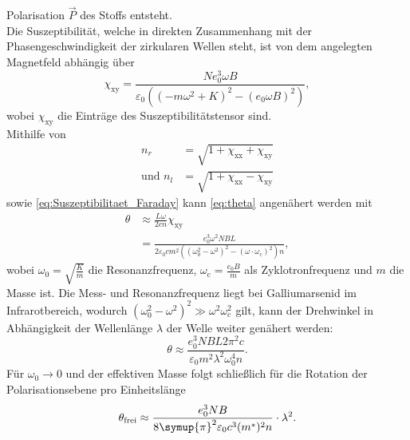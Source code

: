 Polarisation $\vec{P}$ des Stoffs entsteht.\\
Die Suszeptibilität, welche in direkten Zusammenhang mit der Phasengeschwindigkeit der zirkularen Wellen steht, ist von dem angelegten Magnetfeld abhängig über
\begin{equation}
    \chi_\text{xy} = \frac{Ne_0^3\omega B}{\varepsilon_0\left(\left(-m\omega^2+K\right)^2-\left(e_0\omega B\right)^2\right)},
    \label{eq:Suszeptibilitaet_Faraday}
\end{equation}
wobei $\chi_\text{xy}$ die Einträge des Suszeptibilitätstensor sind.\\
Mithilfe von 
\begin{align}
    n_r &= \sqrt{1+\chi_\text{xx}+\chi_\text{xy}} \\
     \text{und } n_l &= \sqrt{1+\chi_\text{xx}-\chi_\text{xy}}
\end{align}
sowie \autoref{eq:Suszeptibilitaet_Faraday} kann \autoref{eq:theta} angenähert werden mit 
\begin{align}
    \theta &\approx \frac{L\omega}{2cn}\chi_{\text{xy}} \label{eq:theta_rl_chi} \\
    &= \frac{e_0^3\omega^2 NBL} {2\varepsilon_0 cm^2\left(\left(\omega_0^2-\omega^2\right)^2-\left(\omega \cdot \omega_\text{c}\right)^2\right)n},
\end{align}
wobei $\omega_0 = \sqrt{\frac{K}{m}}$ die Resonanzfrequenz, $\omega_\text{c} = \frac{e_0B}{m}$ als Zyklotronfrequenz und $m$ die Masse ist. Die Mess- und Resonanzfrequenz
liegt bei Galliumarsenid im Infrarotbereich, wodurch $\left(\omega_0^2 - \omega^2\right)^2 \gg \omega^2\omega_c^2$ gilt, kann der Drehwinkel in Abhängigkeit der Wellenlänge
$\lambda$ der Welle weiter genähert werden:
\begin{equation}
    \theta \approx \frac{e_0^3 NBL 2 \pi^2 c}{\varepsilon_0 m^2 \lambda^2 \omega_0^4 n}.
\end{equation}
Für $\omega_0 \rightarrow 0$ und der effektiven Masse folgt schließlich für die Rotation der Polarisationsebene pro Einheitslänge
\begin{equation}
    \label{eqn:t_frei}
    \theta_\text{frei} \approx \frac{e_0^3 N B}{8\symup{\pi}^2 \varepsilon_0 c^3 (m^*)^2 n} \cdot \lambda^2.
\end{equation}
